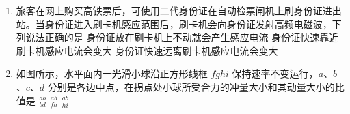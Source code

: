 \documentclass[\gkver]{gaokaozhenti}
\begin{document}
\begin{enumerate}
{A．滤光片仅用于过滤特定波长的光，无法消除玻璃的反射眩光，A 错误。

B．增透膜是镜头本身用来增加整体透光率的薄膜，不能消除玻璃表面的反射眩光，B 错误。

C．偏振片可以阻挡玻璃反射的偏振光，滤除反射眩光后，就能看清车内景物，符合题意，C 正确。

D．增反膜的作用是增强反射，更无法看清车内，D 错误。

故选 C。
}

\item
旅客在网上购买高铁票后，可使用二代身份证在自动检票闸机上刷身份证进出站。当身份证进入刷卡机感应范围后，刷卡机会向身份证发射高频电磁波，下列说法正确的是
{身份证放在刷卡机上不动就会产生感应电流}
{身份证快速靠近刷卡机感应电流会变大}
{身份证快速远离刷卡机感应电流会变大}

\item
如图所示，水平面内一光滑小球沿正方形线框 $fghi$ 保持速率不变运行，$a$、$b$、$c$、$d$ 分别是各边中点，在拐点处小球所受合力的冲量大小和其动量大小的比值是
\onepicture[w=5.5cm]{}
{$\frac{ab}{bd}$}
{$\frac{ab}{fh}$}
{$\frac{ab}{hi}$}
\end{enumerate}
\end{document}
